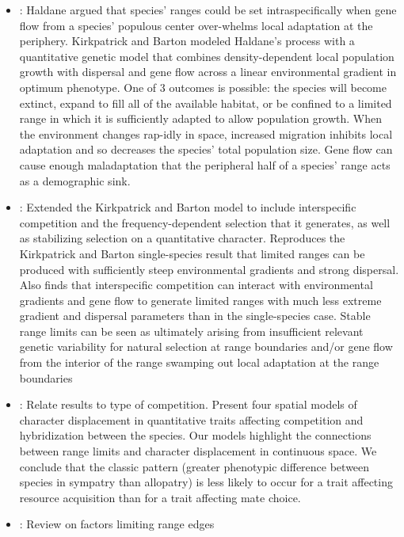 \documentclass[a4paper,11pt]{article}
\begin{document}
\begin{itemize}
\item \citet{Kirkpatrick-1997}: Haldane argued that species' ranges could be set intraspecifically when gene flow from a species' populous center over-whelms local adaptation at the periphery. Kirkpatrick and Barton modeled Haldane's process with a quantitative genetic model that combines density-dependent local population growth with dispersal and gene flow across a linear environmental gradient in optimum phenotype.  One of 3 outcomes is possible: the species will become extinct, expand to fill all of the available habitat, or be confined to a limited range in which it is sufficiently adapted to allow population growth. When the environment changes rap-idly in space, increased migration inhibits local adaptation and so decreases the species' total population size. Gene flow can cause enough maladaptation that the peripheral half of a species' range acts as a demographic sink.
\item \citet{Case-2000}:  Extended the Kirkpatrick and Barton model to include interspecific competition and the frequency-dependent selection that it generates, as well as stabilizing selection on a quantitative character. Reproduces the Kirkpatrick and Barton single-species result that limited ranges can be produced with sufficiently steep environmental gradients and strong dispersal. Also finds that interspecific competition can interact with environmental gradients and gene flow to generate limited ranges with much less extreme gradient and dispersal parameters than in the single-species case. Stable range limits can be seen as ultimately arising from insufficient relevant genetic variability for natural selection at range boundaries and/or gene flow from the interior of the range swamping out local adaptation at the range boundaries
\item \citet{Goldberg-2006}: Relate results to type of competition. Present four spatial models of character displacement in quantitative traits affecting competition and hybridization between the species. Our models highlight the connections between range limits and character displacement in continuous space. We conclude that the classic pattern (greater phenotypic difference between species in sympatry than allopatry) is less likely to occur for a trait affecting resource acquisition than for a trait affecting mate choice.
\item \citet{Bridle-2007}: Review on factors limiting range edges
\end{itemize}
\end{document}
